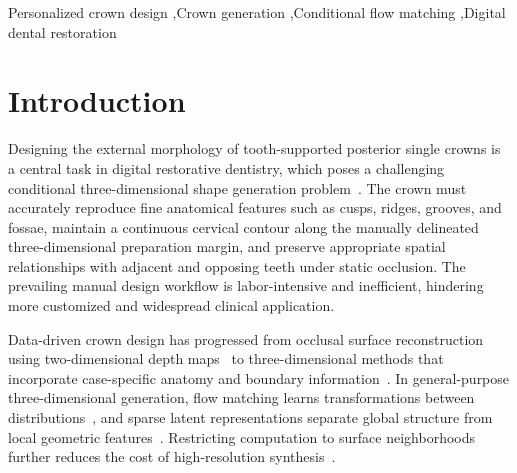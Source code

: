 \documentclass[preprint,review,12pt]{elsarticle}
\begin{document}
\begin{frontmatter}
\begin{highlights}
\end{highlights}

\begin{keyword}
Personalized crown design \sep Crown generation \sep Conditional flow matching \sep Digital dental restoration
\end{keyword}

\end{frontmatter}

\linenumbers


\section{Introduction}\label{sec1}
\setlength{\parindent}{0pt}

\hspace{2em}Designing the external morphology of tooth-supported posterior single crowns is a central task in digital restorative dentistry, which poses a challenging conditional three-dimensional shape generation problem~\cite{neupane2026high,chen2026sv,han2027progressive}. The crown must accurately reproduce fine anatomical features such as cusps, ridges, grooves, and fossae, maintain a continuous cervical contour along the manually delineated three-dimensional preparation margin, and preserve appropriate spatial relationships with adjacent and opposing teeth under static occlusion. The prevailing manual design workflow is labor-intensive and inefficient, hindering more customized and widespread clinical application.

\hspace{2em}Data-driven crown design has progressed from occlusal surface reconstruction using two-dimensional depth maps~\cite{Tian2022DentalRecNet} to three-dimensional methods that incorporate case-specific anatomy and boundary information~\cite{Hosseinimanesh2025PointToMesh,Yang2024DCrownFormer,Wei2025VBCD}. In general-purpose three-dimensional generation, flow matching learns transformations between distributions~\cite{lipman2023flow}, and sparse latent representations separate global structure from local geometric features~\cite{Xiang2025TRELLIS,xiang2026native}. Restricting computation to surface neighborhoods further reduces the cost of high-resolution synthesis~\cite{He2025SparseFlex,Wu2025Direct3DS2}.
\end{document}
